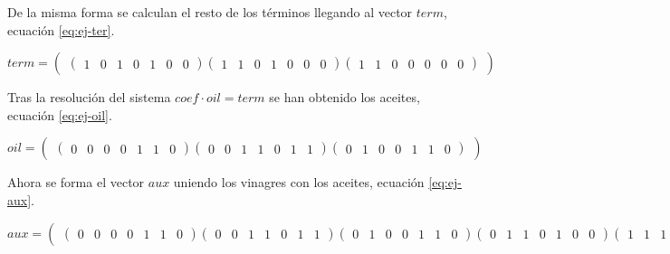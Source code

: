 De la misma forma se calculan el resto de los términos llegando al vector $term$, ecuación \ref{eq:ej-ter}.

\begin{equation}\label{eq:ej-ter}
	{term} = 
		\left(\begin{matrix}
			\left(\begin{smallmatrix}1 & 0 & 1 & 0 & 1 & 0 & 0\end{smallmatrix}\right)			
			\left(\begin{smallmatrix}1 & 1 & 0 & 1 & 0 & 0 & 0\end{smallmatrix}\right)
			\left(\begin{smallmatrix}1 & 1 & 0 & 0 & 0 & 0 & 0\end{smallmatrix}\right)
		\end{matrix}\right)
\end{equation}

Tras la resolución del sistema $coef \cdot oil = term$ se han obtenido los aceites, ecuación \ref{eq:ej-oil}.

\begin{equation}\label{eq:ej-oil}
	{oil} = 
		\left(\begin{matrix}
			\left(\begin{smallmatrix}0 & 0 & 0 & 0 & 1 & 1 & 0\end{smallmatrix}\right)			
			\left(\begin{smallmatrix}0 & 0 & 1 & 1 & 0 & 1 & 1\end{smallmatrix}\right)
			\left(\begin{smallmatrix}0 & 1 & 0 & 0 & 1 & 1 & 0\end{smallmatrix}\right)
		\end{matrix}\right)
\end{equation}

Ahora se forma el vector $aux$ uniendo los vinagres con los aceites, ecuación \ref{eq:ej-aux}.

\begin{equation}\label{eq:ej-aux}
	{aux} = 
		\left(\begin{matrix}
			\left(\begin{smallmatrix}0 & 0 & 0 & 0 & 1 & 1 & 0\end{smallmatrix}\right)		
			\left(\begin{smallmatrix}0 & 0 & 1 & 1 & 0 & 1 & 1\end{smallmatrix}\right)
			\left(\begin{smallmatrix}0 & 1 & 0 & 0 & 1 & 1 & 0\end{smallmatrix}\right)
			\left(\begin{smallmatrix}0 & 1 & 1 & 0 & 1 & 0 & 0\end{smallmatrix}\right)
			\left(\begin{smallmatrix}1 & 1 & 1 & 1 & 1 & 0 & 0\end{smallmatrix}\right)
			\left(\begin{smallmatrix}1 & 1 & 1 & 1 & 0 & 0 & 1\end{smallmatrix}\right)
		\end{matrix}\right)
\end{equation}

